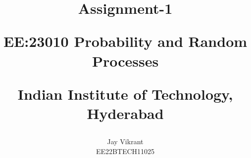 \documentclass[journal,12pt,twocolumn]{IEEEtran}
\theoremstyle{remark}
\begin{document}
%




\vspace{3cm}

\title{
Assignment-1 

\large{EE:23010 Probability and Random Processes}

Indian Institute of Technology, Hyderabad
}
\author{Jay Vikrant

EE22BTECH11025
}	


%
%
%

% 
%



% 
\end{document}
